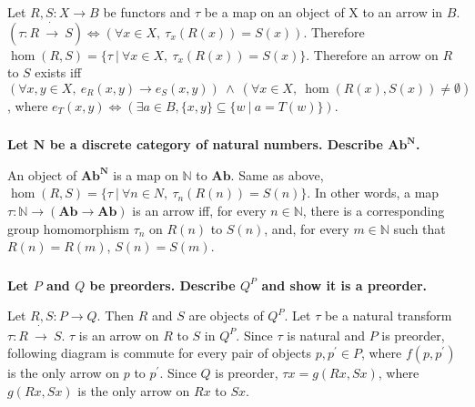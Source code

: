 \documentclass{article}
\begin{document}
Let $R, S : X \rightarrow B$ be functors and $\tau$ be a map on an object of X to an arrow in $B$. $(\tau : R\ \dot{\rightarrow}\ S) \Leftrightarrow (\forall x \in X,\ \tau_x(R(x)) = S(x))$. Therefore $\hom(R, S) = \{\tau\ |\ \forall x \in X,\ \tau_x(R(x)) = S(x)\}$. Therefore an arrow on $R$ to $S$ exists iff $(\forall x, y \in X,\ e_R(x, y) \rightarrow e_S(x, y))\ \wedge\ (\forall x \in X,\ \hom(R(x), S(x)) \neq \emptyset)$, where $e_T(x, y) \Leftrightarrow (\exists a \in B, \{x, y\} \subseteq \{ w\ |\ a = T(w) \})$.

\subsubsection{}

\textbf{Let $\mathbf{N}$ be a discrete category of natural numbers. Describe $\mathbf{Ab}^{\mathbf{N}}$.}

An object of $\mathbf{Ab}^{\mathbf{N}}$ is a map on $\mathbb{N}$ to $\mathbf{Ab}$. Same as above, $\hom(R, S) = \{\tau\ |\ \forall n \in N,\ \tau_n(R(n)) = S(n)\}$. In other words, a map $\tau : \mathbb{N} \rightarrow (\mathbf{Ab} \rightarrow \mathbf{Ab})$ is an arrow iff, for every $n \in \mathbb{N}$, there is a corresponding group homomorphism $\tau_n$ on $R(n)$ to $S(n)$, and, for every $m \in \mathbb{N}$ such that $R(n) = R(m)$, $S(n) = S(m)$. 

\subsubsection{}

\textbf{Let $P$ and $Q$ be preorders. Describe $Q^P$ and show it is a preorder.}

Let $R, S : P \rightarrow Q$. Then $R$ and $S$ are objects of $Q^P$. Let $\tau$ be a natural transform $\tau : R\ \dot{\rightarrow}\ S$. $\tau$ is an arrow on $R$ to $S$ in $Q^P$. Since $\tau$ is natural and $P$ is preorder, following diagram is commute for every pair of objects $p, p^\prime \in P$, where $f(p, p^\prime)$ is the only arrow on $p$ to $p^\prime$. Since $Q$ is preorder, $\tau x = g(Rx, Sx)$, where $g(Rx, Sx)$ is the only arrow on $Rx$ to $Sx$.

\begin{center}
\end{center}
\end{document}
